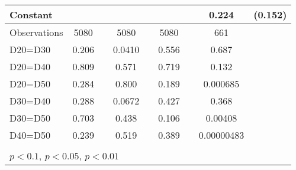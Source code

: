 \begin{tabular}{l|cccccc|cc}
Constant        &                  &         &                  &         &                  &         &    0.224         &  (0.152)\\
\hline
Observations    &     5080         &         &     5080         &         &     5080         &         &      661         &         \\
D20=D30         &    0.206         &         &   0.0410         &         &    0.556         &         &    0.687         &         \\
D20=D40         &    0.809         &         &    0.571         &         &    0.719         &         &    0.132         &         \\
D20=D50         &    0.284         &         &    0.800         &         &    0.189         &         & 0.000685         &         \\
D30=D40         &    0.288         &         &   0.0672         &         &    0.427         &         &    0.368         &         \\
D30=D50         &    0.703         &         &    0.438         &         &    0.106         &         &  0.00408         &         \\
D40=D50         &    0.239         &         &    0.519         &         &    0.389         &         &0.00000483         &         \\
\hline\hline
\multicolumn{9}{p{16cm}}{\tiny }\\
\multicolumn{9}{l}{\tiny \sym{*} \(p<0.1\), \sym{**} \(p<0.05\), \sym{***} \(p<0.01\)}\\
\end{tabular}